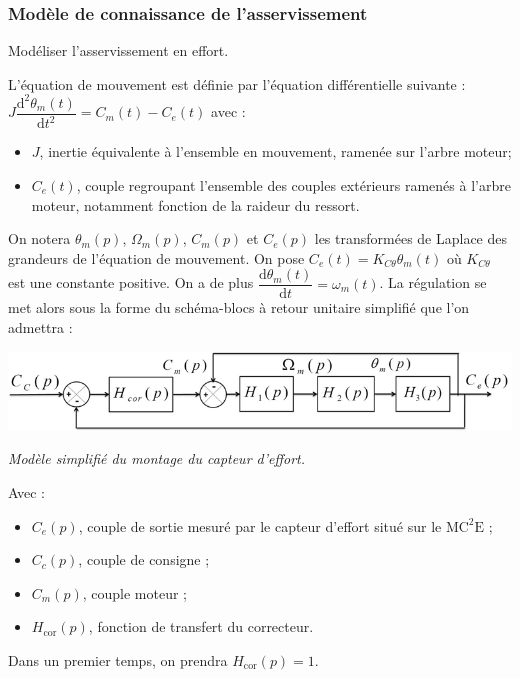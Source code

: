 \documentclass[10pt,fleqn]{article} %
\begin{document}
\begin{multicols}{2}
\subsubsection*{Modèle de connaissance de l'asservissement}

\begin{obj}
Modéliser l’asservissement en effort.
\end{obj}

L’équation de mouvement est définie par l’équation différentielle suivante : 
$J\dfrac{\text{d}^2\theta_m(t)}{\text{d}t^2}=C_m(t)-C_e(t)$  avec :
\begin{itemize}
\item $J$, inertie équivalente à l’ensemble en mouvement, ramenée sur l’arbre moteur;
\item $C_e(t)$, couple regroupant l’ensemble des couples extérieurs ramenés à l’arbre moteur, notamment fonction de la raideur du ressort.
\end{itemize}


On notera $\theta_m(p)$, $\Omega_m(p)$, $C_m(p)$ et $C_e(p)$ les transformées de Laplace des grandeurs de l’équation de mouvement.
On pose $C_e(t)=K_{C\theta}\theta_m(t)$ où  $K_{C\theta}$ est une constante positive. On a de plus $\dfrac{\text{d}\theta_m(t)}{\text{d}t}=\omega_m(t)$. La régulation se met alors sous la forme du schéma-blocs à retour unitaire simplifié que l’on
admettra :

\begin{center}
\includegraphics[width=\linewidth]{images/fig_06}

\textit{Modèle simplifié du montage du capteur d’effort.}
\end{center}

Avec :
\begin{itemize}
\item $C_e(p)$, couple de sortie mesuré par le capteur d’effort situé sur le $\text{MC}^2\text{E}$ ;
\item $C_c(p)$, couple de consigne ;
\item $C_m(p)$, couple moteur ;
\item $H_{\text{cor}}(p)$, fonction de transfert du correcteur.
\end{itemize}
Dans un premier temps, on prendra $H_{\text{cor}}(p)=1$.


\end{multicols}
\end{document}
